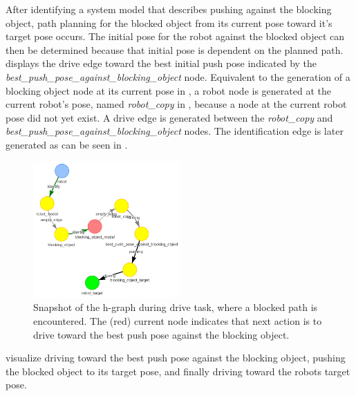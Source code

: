 After identifying a system model that describes pushing against the blocking object, path planning for the blocked object from its current pose toward it's target pose occurs. The initial pose for the robot against the blocked object can then be determined because that initial pose is dependent on the planned path.  displays the drive edge toward the best initial push pose indicated by the \textit{best\_push\_pose\_against\_blocking\_object} node. Equivalent to the generation of a blocking object node at its current pose in , a robot node is generated at the current robot's pose, named \textit{robot\_copy} in , because a node at the current robot pose did not yet exist. A drive edge is generated between the \textit{robot\_copy} and \textit{best\_push\_pose\_against\_blocking\_object} nodes. The identification edge is later generated as can be seen in .\bs

\begin{figure}[H]
    \centering
    \includegraphics[width=0.5\textwidth]{figures/proposed_method/connecting_nodes/blocking_obj/blocking_obj_4}
    \caption{Snapshot of the \ac{h-graph} during drive task, where a blocked path is encountered. The (red) current node indicates that next action is to drive toward the best push pose against the blocking object.}\label{subfig:blocking_obj_4}
\end{figure}

 visualize driving toward the best push pose against the blocking object, pushing the blocked object to its target pose, and finally driving toward the robots target pose.\bs

